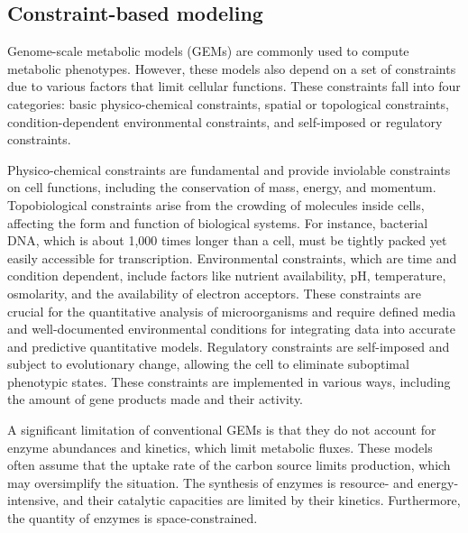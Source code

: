 \subsection{Constraint-based modeling}

Genome-scale metabolic models (GEMs) are commonly used to compute metabolic phenotypes. However, these models also depend on a set of constraints due to various factors that limit cellular functions. These constraints fall into four categories: basic physico-chemical constraints, spatial or topological constraints, condition-dependent environmental constraints, and self-imposed or regulatory constraints. \cite{Price2004}

Physico-chemical constraints are fundamental and provide inviolable constraints on cell functions, including the conservation of mass, energy, and momentum. Topobiological constraints arise from the crowding of molecules inside cells, affecting the form and function of biological systems. For instance, bacterial DNA, which is about 1,000 times longer than a cell, must be tightly packed yet easily accessible for transcription. \cite{Price2004}
Environmental constraints, which are time and condition dependent, include factors like nutrient availability, pH, temperature, osmolarity, and the availability of electron acceptors. These constraints are crucial for the quantitative analysis of microorganisms and require defined media and well-documented environmental conditions for integrating data into accurate and predictive quantitative models. Regulatory constraints are self-imposed and subject to evolutionary change, allowing the cell to eliminate suboptimal phenotypic states. These constraints are implemented in various ways, including the amount of gene products made and their activity. \cite{Price2004}

A significant limitation of conventional GEMs is that they do not account for enzyme abundances and kinetics, which limit metabolic fluxes. These models often assume that the uptake rate of the carbon source limits production, which may oversimplify the situation. \cite{Sanchez2017} The synthesis of enzymes is resource- and energy-intensive, and their catalytic capacities are limited by their kinetics. Furthermore, the quantity of enzymes is space-constrained. \cite{Kerkhoven2022}

